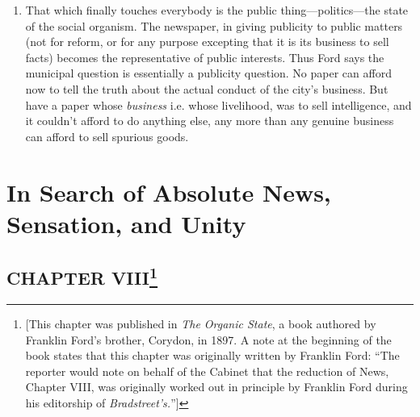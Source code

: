 \documentclass[openany,nobib]{tufte-book}
\let\oldchapter\chapter
\def\chapter{%
  \setcounter{footnote}{0}%
  \oldchapter
}
\begin{document}
\begin{enumerate}
    \item That which finally touches everybody is the public
thing---politics---the state of the social organism. The newspaper, in
giving publicity to public matters (not for reform, or for any purpose
excepting that it is its business to sell facts) becomes the
representative of public interests. Thus Ford says the municipal
question is essentially a publicity question. No paper can afford now to
tell the truth about the actual conduct of the city's business. But have
a paper whose \emph{business} i.e. whose livelihood, was to sell
intelligence, and it couldn't afford to do anything else, any more than
any genuine business can afford to sell spurious goods.

\end{enumerate}


\chapter[In Search of Absolute News, Sensation, and Unity]{In Search of Absolute News, Sensation, and Unity}
\label{ch:In Search of Absolute News, Sensation, and Unity}

\vspace{.2in}

\begin{LARGE}


\end{LARGE}

\vspace{0.5in}
\hypertarget{chapter-viii}{%
\section[CHAPTER VIII~]{\texorpdfstring{CHAPTER
VIII\footnote{{[}This chapter was published in \emph{The Organic
  State}, a book authored by Franklin Ford's brother, Corydon, in 1897.
  A note at the beginning of the book states that this chapter was
  originally written by Franklin Ford: ``The reporter would note on
  behalf of the Cabinet that the reduction of News, Chapter VIII, was
  originally worked out in principle by Franklin Ford during his
  editorship of \emph{Bradstreet's.}''{]}}}{CHAPTER VIII~}}\label{chapter-viii}}
\end{document}

